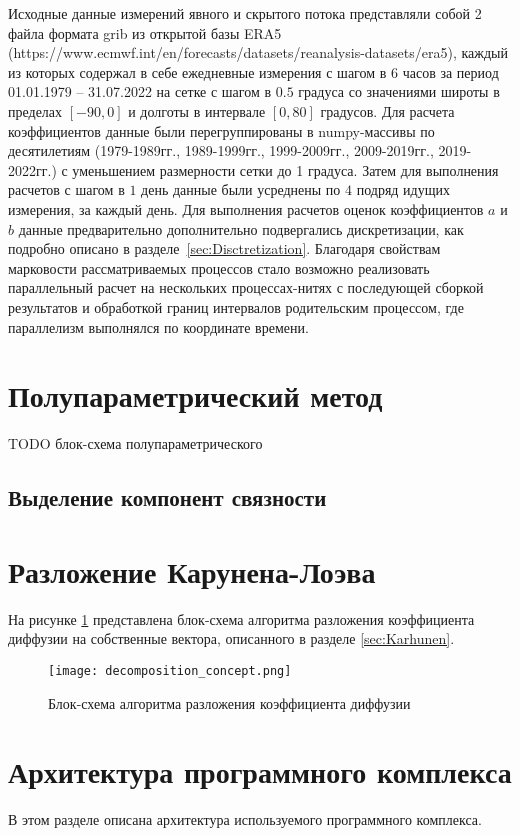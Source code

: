 Исходные данные измерений явного и скрытого потока представляли собой 2 файла формата grib из открытой базы ERA5 (https://www.ecmwf.int/en/forecasts/datasets/reanalysis-datasets/era5), каждый из которых содержал в себе ежедневные измерения с шагом в $6$ часов за период 01.01.1979 -- 31.07.2022 на сетке с шагом в $0.5$ градуса со значениями широты в пределах $[-90, 0]$ и долготы в интервале $[0, 80]$ градусов. Для расчета коэффициентов данные были перегруппированы в numpy-массивы по десятилетиям (1979-1989гг., 1989-1999гг., 1999-2009гг., 2009-2019гг., 2019-2022гг.) с уменьшением размерности сетки до 1 градуса. Затем для выполнения расчетов с шагом в $1$ день данные были усреднены по $4$ подряд идущих измерения, за каждый день. Для выполнения расчетов оценок коэффициентов $a$ и $b$ данные предварительно дополнительно подвергались дискретизации, как подробно описано в разделе~\ref{sec:Disctretization}. Благодаря свойствам марковости рассматриваемых процессов стало возможно реализовать параллельный расчет на нескольких процессах-нитях с последующей сборкой результатов и обработкой границ интервалов родительским процессом, где параллелизм выполнялся по координате времени. 


\section{Полупараметрический метод}
\label{sec:AlgoSemiparametric}
TODO блок-схема полупараметрического

\subsection{Выделение компонент связности}
\label{sec:ComponentsAlgo}

\section{Разложение Карунена-Лоэва}
\label{sec:AlgoKarhunen}
На рисунке \ref{fig:KarhunenAlgo} представлена блок-схема алгоритма разложения коэффициента диффузии на собственные вектора, описанного в разделе \ref{sec:Karhunen}.
\begin{figure}
	\centering
	\texttt{[image: decomposition\_concept.png]}
	\caption{Блок-схема алгоритма разложения коэффициента диффузии}
	\label{fig:KarhunenAlgo}
\end{figure}



\section{Архитектура программного комплекса}
В этом разделе описана архитектура используемого программного комплекса.


